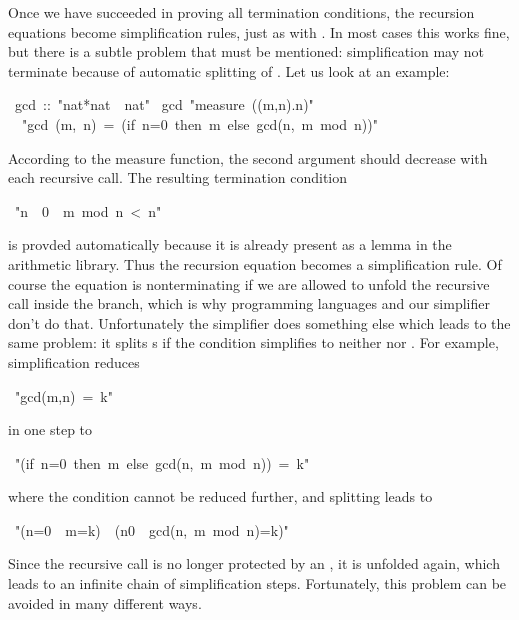 \begin{isabelle}%
%
\begin{isamarkuptext}%
Once we have succeeded in proving all termination conditions, the recursion
equations become simplification rules, just as with
. In most cases this works fine, but there is a subtle
problem that must be mentioned: simplification may not
terminate because of automatic splitting of .
Let us look at an example:%
\end{isamarkuptext}%
~gcd~::~{"}nat*nat~{\isasymRightarrow}~nat{"}\isanewline
{}~gcd~{"}measure~({\isasymlambda}(m,n).n){"}\isanewline
~~{"}gcd~(m,~n)~=~(if~n=0~then~m~else~gcd(n,~m~mod~n)){"}%
\begin{isamarkuptext}%
\noindent
According to the measure function, the second argument should decrease with
each recursive call. The resulting termination condition%
\end{isamarkuptext}%
~{"}n~{\isasymnoteq}~0~{\isasymLongrightarrow}~m~mod~n~<~n{"}%
\begin{isamarkuptext}%
\noindent
is provded automatically because it is already present as a lemma in the
arithmetic library. Thus the recursion equation becomes a simplification
rule. Of course the equation is nonterminating if we are allowed to unfold
the recursive call inside the  branch, which is why programming
languages and our simplifier don't do that. Unfortunately the simplifier does
something else which leads to the same problem: it splits s if the
condition simplifies to neither  nor . For
example, simplification reduces%
\end{isamarkuptext}%
~{"}gcd(m,n)~=~k{"}%
\begin{isamarkuptext}%
\noindent
in one step to%
\end{isamarkuptext}%
~{"}(if~n=0~then~m~else~gcd(n,~m~mod~n))~=~k{"}%
\begin{isamarkuptext}%
\noindent
where the condition cannot be reduced further, and splitting leads to%
\end{isamarkuptext}%
~{"}(n=0~{\isasymlongrightarrow}~m=k)~{\isasymand}~(n{\isasymnoteq}0~{\isasymlongrightarrow}~gcd(n,~m~mod~n)=k){"}%
\begin{isamarkuptext}%
\noindent
Since the recursive call  is no longer protected by
an , it is unfolded again, which leads to an infinite chain of simplification steps.
Fortunately, this problem can be avoided in many different ways.


\end{isamarkuptext}
\end{isabelle}
